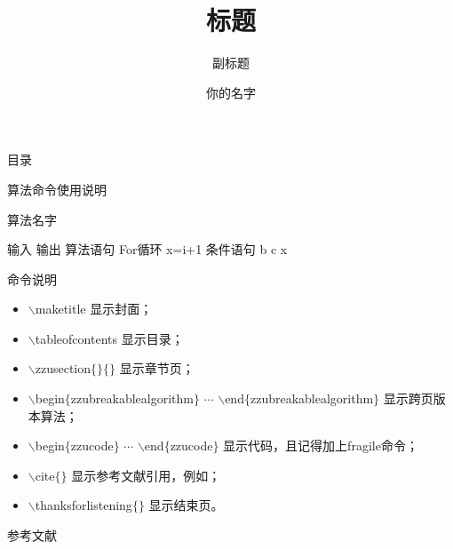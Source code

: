 \documentclass[compress, aspectratio=1610]{zzu-slide}
\title{标题}
\subtitle{副标题}
\author{你的名字}
\begin{document}
	
	\maketitle
	
	\begin{frame}{目录}
        \tableofcontents
	\end{frame}
	

    \begin{frame}{算法命令使用说明}
        \begin{zzucode}[language=TeX]
\begin{zzubreakablealgorithm}
    \caption{算法名字} %
    \label{算法标签}
    \begin{algorithmic}[1]
        \Require 输入
        \Ensure 输出
        \State 算法语句
         For循环
            \State x=i+1
        \EndFor
         条件语句
            \State b
        \Else
            \State c
        \EndIf
        \State \Return x 
    \end{algorithmic}
\end{zzubreakablealgorithm}
        \end{zzucode}
    \end{frame}

    \begin{frame}{命令说明}
        \begin{itemize}
            \item $\backslash$maketitle 显示封面；
            \item $\backslash$tableofcontents 显示目录；
            \item $\backslash$zzusection$\{\}\{\}$ 显示章节页；
            \item $\backslash$begin$\{$zzubreakablealgorithm$\}$ $\cdots$ $\backslash$end$\{$zzubreakablealgorithm$\}$ 显示跨页版本算法；
            \item $\backslash$begin$\{$zzucode$\}$ $\cdots$ $\backslash$end$\{$zzucode$\}$ 显示代码，且记得加上fragile命令；
            \item $\backslash$cite$\{\}$ 显示参考文献引用，例如\cite{barmpoutis2020review}；
            \item $\backslash$thanksforlistening$\{\}$ 显示结束页。
        \end{itemize}
    \end{frame}
	
    \begin{frame}[allowframebreaks]{参考文献}
        \printbibliography
    \end{frame}

	
\end{document}
